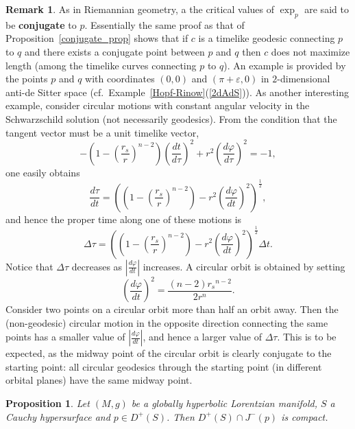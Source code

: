 \documentclass[12pt]{amsart}
\newtheorem{Prop}[Thm]{Proposition}
\theoremstyle{definition}
\newtheorem{Remark}[Thm]{Remark}
\theoremstyle{remark}
\begin{document}
\begin{Remark}
As in Riemannian geometry, a the critical values of $\exp_p$ are said to be {\bf conjugate} to $p$. Essentially the same proof as that of Proposition~\ref{conjugate_prop} shows that if $c$ is a timelike geodesic connecting $p$ to $q$ and there exists a conjugate point between $p$ and $q$ then $c$ does not maximize length (among the timelike curves connecting $p$ to $q$). An example is provided by the points $p$ and $q$ with coordinates $(0,0)$ and $(\pi + \varepsilon, 0)$ in $2$-dimensional anti-de Sitter space (cf.~Example~\ref{Hopf-Rinow}(\ref{2dAdS})). As another interesting example, consider circular motions with constant angular velocity in the Schwarzschild solution (not necessarily geodesics). From the condition that the tangent vector must be a unit timelike vector,
\[
- \left( 1 - \left(\frac{r_s}{r}\right)^{n-2} \right) \left(\frac{dt}{d\tau}\right)^2 + r^2 \left(\frac{d\varphi}{d\tau}\right)^2 = -1,
\]
one easily obtains
\[
\frac{d\tau}{dt} = \left(\left( 1 - \left(\frac{r_s}{r}\right)^{n-2} \right) - r^2 \left(\frac{d\varphi}{dt}\right)^2\right)^{\frac12},
\]
and hence the proper time along one of these motions is
\[
\Delta \tau =  \left(\left( 1 - \left(\frac{r_s}{r}\right)^{n-2} \right) - r^2 \left(\frac{d\varphi}{dt}\right)^2\right)^{\frac12} \Delta t.
\] 
Notice that $\Delta \tau$ decreases as $\left|\frac{d\varphi}{dt}\right|$ increases. A circular orbit is obtained by setting
\[
\left( \frac{d\varphi}{dt} \right)^2 = \frac{(n-2){r_s}^{n-2}}{2r^n}.
\]
Consider two points on a circular orbit more than half an orbit away. Then the (non-geodesic) circular motion in the opposite direction connecting the same points has a smaller value of $\left|\frac{d\varphi}{dt}\right|$, and hence a larger value of $\Delta \tau$. This is to be expected, as the midway point of the circular orbit is clearly conjugate to the starting point: all circular geodesics through the starting point (in different orbital planes) have the same midway point.
\end{Remark}

\begin{Prop} \label{compact_prop}
Let $(M,g)$ be a globally hyperbolic Lorentzian manifold, $S$ a Cauchy hypersurface and $p \in D^+(S)$. Then $D^+(S)\cap J^-(p)$ is compact.
\end{Prop}
\end{document}
